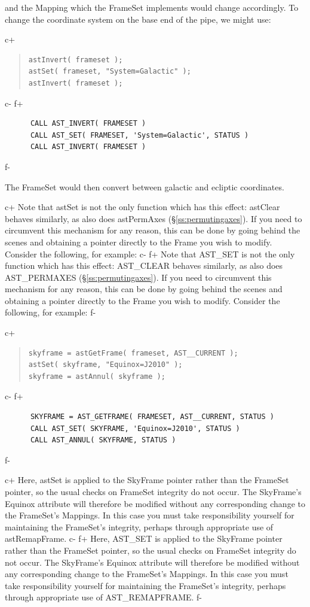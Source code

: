 \documentclass[twoside,11pt]{article}
\newcommand{\secref}[1]{\S\ref{#1}}
\newcommand{\secref}[1]{\ref{#1}}
\begin{document}
and the Mapping which the FrameSet implements would change
accordingly. To change the coordinate system on the base end of the
pipe, we might use:

c+
\begin{quote}
\small
\begin{verbatim}
astInvert( frameset );
astSet( frameset, "System=Galactic" );
astInvert( frameset );
\end{verbatim}
\normalsize
\end{quote}
c-
f+
\small
\begin{verbatim}
      CALL AST_INVERT( FRAMESET )
      CALL AST_SET( FRAMESET, 'System=Galactic', STATUS )
      CALL AST_INVERT( FRAMESET )
\end{verbatim}
\normalsize
f-

The FrameSet would then convert between galactic and ecliptic
coordinates.

c+
Note that astSet is not the only function which has this effect:
astClear behaves similarly, as also does astPermAxes
(\secref{ss:permutingaxes}). If you need to circumvent this mechanism
for any reason, this can be done by going behind the scenes and
obtaining a pointer directly to the Frame you wish to modify. Consider
the following, for example:
c-
f+
Note that AST\_SET is not the only function which has this effect:
AST\_CLEAR behaves similarly, as also does AST\_PERMAXES
(\secref{ss:permutingaxes}). If you need to circumvent this mechanism
for any reason, this can be done by going behind the scenes and
obtaining a pointer directly to the Frame you wish to modify. Consider
the following, for example:
f-

c+
\begin{quote}
\small
\begin{verbatim}
skyframe = astGetFrame( frameset, AST__CURRENT );
astSet( skyframe, "Equinox=J2010" );
skyframe = astAnnul( skyframe );
\end{verbatim}
\normalsize
\end{quote}
c-
f+
\small
\begin{verbatim}
      SKYFRAME = AST_GETFRAME( FRAMESET, AST__CURRENT, STATUS )
      CALL AST_SET( SKYFRAME, 'Equinox=J2010', STATUS )
      CALL AST_ANNUL( SKYFRAME, STATUS )
\end{verbatim}
\normalsize
f-

c+
Here, astSet is applied to the SkyFrame pointer rather than the
FrameSet pointer, so the usual checks on FrameSet integrity do not
occur. The SkyFrame's Equinox attribute will therefore be modified
without any corresponding change to the FrameSet's Mappings.  In this
case you must take responsibility yourself for maintaining the
FrameSet's integrity, perhaps through appropriate use of
astRemapFrame.
c-
f+
Here, AST\_SET is applied to the SkyFrame pointer rather than the
FrameSet pointer, so the usual checks on FrameSet integrity do not
occur. The SkyFrame's Equinox attribute will therefore be modified
without any corresponding change to the FrameSet's Mappings.  In this
case you must take responsibility yourself for maintaining the
FrameSet's integrity, perhaps through appropriate use of
AST\_REMAPFRAME.
f-
\end{document}
